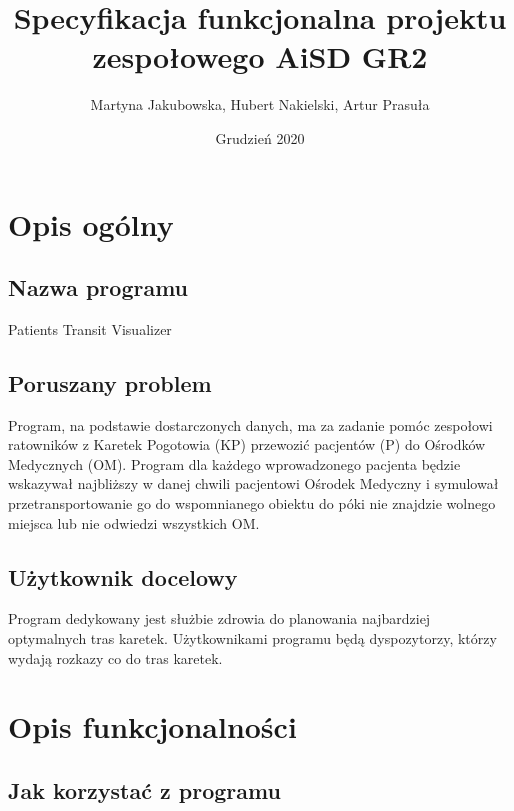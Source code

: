 \documentclass[]{article}
\title{Specyfikacja funkcjonalna projektu zespołowego \textbf{AiSD GR2}}
\author{Martyna Jakubowska, Hubert Nakielski, Artur Prasuła}
\date{Grudzień 2020}
\begin{document}
    \maketitle


    \section{Opis ogólny}

    \subsection{Nazwa programu} %
    Patients Transit Visualizer

    \subsection{Poruszany problem} %
    Program, na podstawie dostarczonych danych, ma za zadanie pomóc zespołowi ratowników z Karetek Pogotowia (KP) przewozić pacjentów (P) do Ośrodków Medycznych (OM). Program dla każdego wprowadzonego pacjenta będzie wskazywał najbliższy w danej chwili pacjentowi Ośrodek Medyczny i symulował przetransportowanie go do wspomnianego obiektu do póki nie znajdzie wolnego miejsca lub nie odwiedzi wszystkich OM.

    \subsection{Użytkownik docelowy}
    Program dedykowany jest służbie zdrowia do planowania najbardziej optymalnych tras karetek.
    Użytkownikami programu będą dyspozytorzy, którzy wydają rozkazy co do tras karetek.


    \section{Opis funkcjonalności}

    \subsection{Jak korzystać z programu} %
\end{document}
